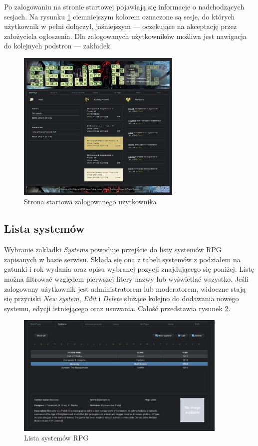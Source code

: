 \hspace{15pt}Po zalogowaniu na stronie startowej pojawiają się informacje o nadchodzących sesjach. Na rysunku \ref{fig:start_page_joined} ciemniejszym kolorem oznaczone są sesje, do których użytkownik w pełni dołączył, jaśniejszym --- oczekujące na akceptację przez założyciela ogłoszenia. Dla zalogowanych użytkowników możliwa jest nawigacja do kolejnych podstron --- zakładek.
\begin{figure}[h!]	
\centering
\includegraphics[width=0.7\textwidth]{./img/interfejsy/start_page_joined}
\caption{Strona startowa zalogowanego użytkownika}
\label{fig:start_page_joined}
\end{figure}

\subsection*{Lista systemów}
\label{sec:systems}
\hspace{15pt}Wybranie zakładki \emph{Systems} powoduje przejście do listy systemów RPG zapisanych w bazie serwisu. Składa się ona z tabeli systemów z podziałem na gatunki i rok wydania oraz opisu wybranej pozycji znajdującego się poniżej. Listę można filtrować względem pierwszej litery nazwy lub wyświetlać wszystko. Jeśli zalogowany użytkownik jest administratorem lub moderatorem, widoczne stają się przyciski \emph{New system}, \emph{Edit} i \emph{Delete} służące kolejno do dodawania nowego systemu, edycji istniejącego oraz usuwania. Całość przedstawia rysunek \ref{fig:systems}.

\begin{figure}[h!]
\centering
\includegraphics[width=0.9\textwidth]{./img/interfejsy/systems}
\caption{Lista systemów RPG}
\label{fig:systems}
\end{figure}

